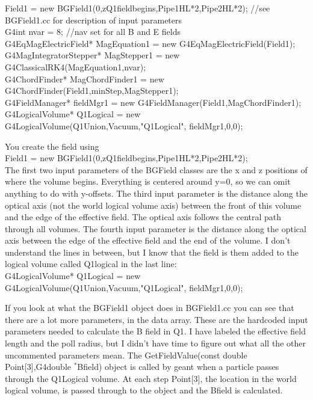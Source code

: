\documentclass[letter,11pt]{article}
\newcommand{\filefont}[1]{{\scriptsize\ttfamily\selectfont #1}\xspace}
\begin{document}
\filefont{
    Field1 = new BGField1(0,zQ1fieldbegins,Pipe1HL*2,Pipe2HL*2); //see BGField1.cc for description of input parameters\\
    G4int nvar = 8; //nav set for all B and E fields\\
	G4EqMagElectricField* MagEquation1 = new G4EqMagElectricField(Field1);\\
	G4MagIntegratorStepper* MagStepper1 = new G4ClassicalRK4(MagEquation1,nvar);\\
	G4ChordFinder* MagChordFinder1 = new G4ChordFinder(Field1,minStep,MagStepper1);\\
	G4FieldManager* fieldMgr1 = new G4FieldManager(Field1,MagChordFinder1);\\
	G4LogicalVolume* Q1Logical = new G4LogicalVolume(Q1Union,Vacuum,"Q1Logical", fieldMgr1,0,0);\\
}

You create the field using\\
\filefont{Field1 = new BGField1(0,zQ1fieldbegins,Pipe1HL*2,Pipe2HL*2);}\\
The first two input parameters of the BGField classes are the x and z positions of where the volume begins. Everything is centered around y=0, so we can omit anything to do with y-offsets. The third input parameter is the distance along the optical axis (not the world logical volume axis) between the front of this volume and the edge of the effective field. The optical axis follows the central path through all volumes. The fourth input parameter is the distance along the optical axis between the edge of the effective field and the end of the volume. I don't understand the lines in between, but I know that the field is them added to the logical volume called \filefont{Q1logical} in the last line:\\
\filefont{G4LogicalVolume* Q1Logical = new G4LogicalVolume(Q1Union,Vacuum,"Q1Logical", fieldMgr1,0,0);}

If you look at what the \filefont{BGField1} object does in BGField1.cc you can see that there are a lot more parameters, in the  \filefont{data} array. These are the hardcoded input parameters needed to calculate the B field in Q1. I have labeled the effective field length and the poll radius, but I didn't have time to figure out what all the other uncommented parameters mean. The \filefont{GetFieldValue(const double Point[3],G4double $^{*}$Bfield)} object is called by geant when a particle passes through the \filefont{Q1Logical} volume. At each step \filefont{Point[3]}, the location in the world logical volume, is passed through to the object and the \filefont{Bfield} is calculated.
\end{document}
